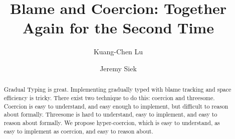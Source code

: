 \documentclass[acmsmall,review,anonymous]{acmart}\settopmatter{printfolios=true,printccs=false,printacmref=false}
\begin{document}
\title{Blame and Coercion: Together Again for the Second Time}


\author{Kuang-Chen Lu}



\author{Jeremy Siek}



\begin{abstract}
	Gradual Typing is great. Implementing gradually typed with blame tracking 
	and space efficiency is tricky. There exist two technique to do this: 
	coercion and threesome. Coercion is easy to understand, and easy enough to 
	implement, but difficult to reason about formally. Threesome is hard to 
	understand, easy to implement, and easy to reason about formally. We 
	propose hyper-coercion, which is easy to understand, as easy to implement 
	as coercion, and easy to reason about.
\end{abstract}
\end{document}
